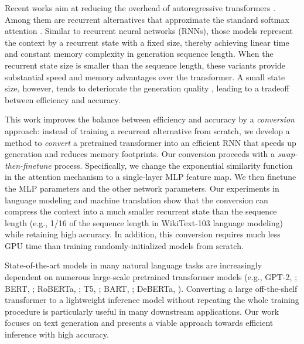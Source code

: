 \documentclass[11pt,a4paper]{article}
\newcommand{\interalia}[1]{\citep[\emph{inter alia}]{#1}}
\begin{document}
Recent works aim at reducing 
the overhead
of autoregressive transformers \interalia{Child2019, Kitaev2020ReformerTE, longformer}. 
Among them are recurrent alternatives that approximate the standard softmax attention \cite{katharopoulos-et-al-2020, RFA, performer,schlag2021linear}.
Similar to recurrent neural networks (RNNs), those models represent the context by a recurrent state with a fixed size, thereby achieving linear time and constant memory complexity in generation sequence length.
When the recurrent state size is smaller than the sequence length, these variants provide substantial speed and memory advantages over the transformer.
A small state size, however, tends to deteriorate the generation quality \cite{RFA}, leading to a tradeoff between efficiency and accuracy.

This work improves the balance between efficiency and accuracy by a \textit{conversion} approach: instead of training a recurrent alternative from scratch, we develop a method to \textit{convert} a pretrained transformer into an efficient RNN that speeds up generation and reduces memory footprints.
Our conversion proceeds with a \textit{swap-then-finetune} process.
Specifically, we change the exponential similarity function in the attention mechanism to a single-layer MLP feature map.
We then finetune the MLP parameters and the other network parameters.
Our experiments in language modeling and machine translation show that the conversion can compress the context into a much smaller recurrent state than the sequence length (e.g., 1/16 of the sequence length in WikiText-103 language modeling) while retaining high accuracy.
In addition, this conversion requires much less GPU time than training randomly-initialized models from scratch.


State-of-the-art models in many natural language tasks are increasingly dependent on numerous large-scale pretrained transformer models (e.g., GPT-2, \citealp{gpt2}; BERT, \citealp{devlins2019bert}; RoBERTa, \citealp{Liu2019RoBERTaAR}; T5, \citealp{2020t5}; BART, \citealp{lewis-etal-2020-bart}; DeBERTa, \citealp{he2021deberta}). 
Converting a large off-the-shelf transformer to a lightweight inference model without repeating the whole training procedure is particularly useful in many downstream applications. 
Our work focuses on text generation and presents a viable approach towards efficient inference with high accuracy.
\end{document}
